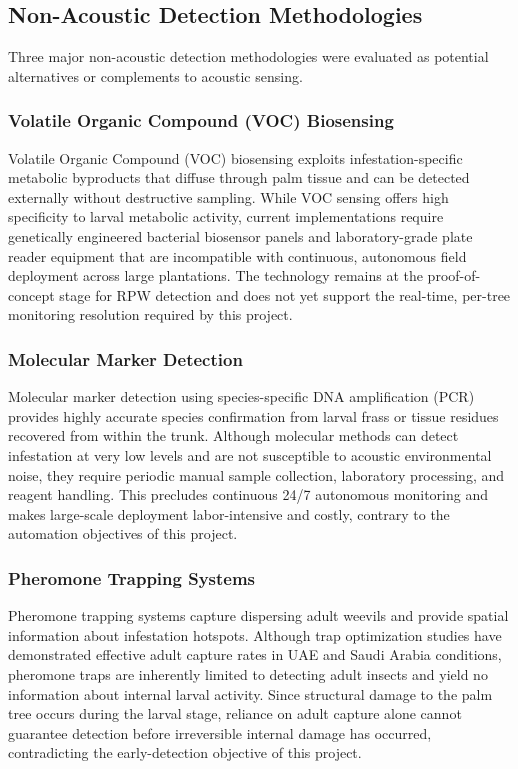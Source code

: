 \documentclass[12pt,a4paper,oneside]{memoir}
\begin{document}
\subsection{Non-Acoustic Detection Methodologies}

Three major non-acoustic detection methodologies were evaluated as potential alternatives or complements to acoustic sensing.

\subsubsection{Volatile Organic Compound (VOC) Biosensing}
Volatile Organic Compound (VOC) biosensing exploits infestation-specific metabolic byproducts that diffuse through palm tissue and can be detected externally without destructive sampling. While VOC sensing offers high specificity to larval metabolic activity, current implementations require genetically engineered bacterial biosensor panels and laboratory-grade plate reader equipment that are incompatible with continuous, autonomous field deployment across large plantations. The technology remains at the proof-of-concept stage for RPW detection and does not yet support the real-time, per-tree monitoring resolution required by this project.

\subsubsection{Molecular Marker Detection}
Molecular marker detection using species-specific DNA amplification (PCR) provides highly accurate species confirmation from larval frass or tissue residues recovered from within the trunk. Although molecular methods can detect infestation at very low levels and are not susceptible to acoustic environmental noise, they require periodic manual sample collection, laboratory processing, and reagent handling. This precludes continuous 24/7 autonomous monitoring and makes large-scale deployment labor-intensive and costly, contrary to the automation objectives of this project.

\subsubsection{Pheromone Trapping Systems}
Pheromone trapping systems capture dispersing adult weevils and provide spatial information about infestation hotspots. Although trap optimization studies have demonstrated effective adult capture rates in UAE and Saudi Arabia conditions, pheromone traps are inherently limited to detecting adult insects and yield no information about internal larval activity. Since structural damage to the palm tree occurs during the larval stage, reliance on adult capture alone cannot guarantee detection before irreversible internal damage has occurred, contradicting the early-detection objective of this project.
\end{document}
